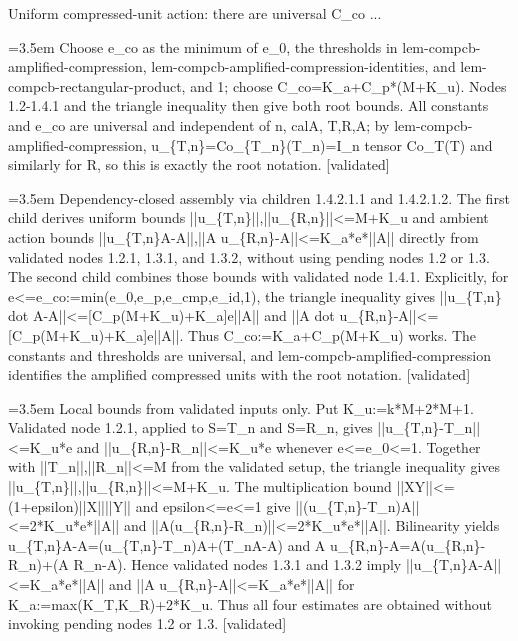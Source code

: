 \documentclass{article}
\newcommand{\step}[1]{\par\noindent\hangindent=3.5em\hangafter=1%
  \makebox[3.5em][l]{\textbf{#1.}}}
\newcommand{\steptag}[1]{\hfill{\small\textsf{[#1]}}}
\begin{document}
\begin{proofbox}{Uniform compressed-unit action: there are universal C\_co ...}
\step{1.4.2} Choose e\_co as the minimum of e\_0, the thresholds in lem-compcb-amplified-compression, lem-compcb-amplified-compression-identities, and lem-compcb-rectangular-product, and 1; choose C\_co=K\_a+C\_p*(M+K\_u). Nodes 1.2-1.4.1 and the triangle inequality then give both root bounds. All constants and e\_co are universal and independent of n, calA, T,R,A; by lem-compcb-amplified-compression, u\_\{T,n\}=Co\_\{T\_n\}(T\_n)=I\_n tensor Co\_T(T) and similarly for R, so this is exactly the root notation. \steptag{validated} \\[6pt]
\step{1.4.2.1} Dependency-closed assembly via children 1.4.2.1.1 and 1.4.2.1.2. The first child derives uniform bounds ||u\_\{T,n\}||,||u\_\{R,n\}||<=M+K\_u and ambient action bounds ||u\_\{T,n\}A-A||,||A u\_\{R,n\}-A||<=K\_a*e*||A|| directly from validated nodes 1.2.1, 1.3.1, and 1.3.2, without using pending nodes 1.2 or 1.3. The second child combines those bounds with validated node 1.4.1. Explicitly, for e<=e\_co:=min(e\_0,e\_p,e\_cmp,e\_id,1), the triangle inequality gives ||u\_\{T,n\} dot A-A||<=[C\_p(M+K\_u)+K\_a]e||A|| and ||A dot u\_\{R,n\}-A||<=[C\_p(M+K\_u)+K\_a]e||A||. Thus C\_co:=K\_a+C\_p(M+K\_u) works. The constants and thresholds are universal, and lem-compcb-amplified-compression identifies the amplified compressed units with the root notation. \steptag{validated} \\[6pt]
\step{1.4.2.1.1} Local bounds from validated inputs only. Put K\_u:=k*M+2*M+1. Validated node 1.2.1, applied to S=T\_n and S=R\_n, gives ||u\_\{T,n\}-T\_n||<=K\_u*e and ||u\_\{R,n\}-R\_n||<=K\_u*e whenever e<=e\_0<=1. Together with ||T\_n||,||R\_n||<=M from the validated setup, the triangle inequality gives ||u\_\{T,n\}||,||u\_\{R,n\}||<=M+K\_u. The multiplication bound ||XY||<=(1+epsilon)||X||||Y|| and epsilon<=e<=1 give ||(u\_\{T,n\}-T\_n)A||<=2*K\_u*e*||A|| and ||A(u\_\{R,n\}-R\_n)||<=2*K\_u*e*||A||. Bilinearity yields u\_\{T,n\}A-A=(u\_\{T,n\}-T\_n)A+(T\_nA-A) and A u\_\{R,n\}-A=A(u\_\{R,n\}-R\_n)+(A R\_n-A). Hence validated nodes 1.3.1 and 1.3.2 imply ||u\_\{T,n\}A-A||<=K\_a*e*||A|| and ||A u\_\{R,n\}-A||<=K\_a*e*||A|| for K\_a:=max(K\_T,K\_R)+2*K\_u. Thus all four estimates are obtained without invoking pending nodes 1.2 or 1.3. \steptag{validated} \\[4pt]

\end{proofbox}
\end{document}
